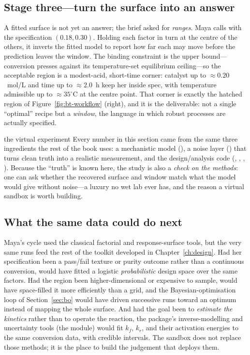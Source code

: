 \subsection{Stage three---turn the surface into an answer}

A fitted surface is not yet an answer; the brief asked for \emph{ranges}. Maya
calls  with the specification
$(0.18,0.30)$. Holding each factor in turn at the centre of the others, it inverts
the fitted model to report how far each may move before the prediction leaves the
window. The binding constraint is the upper bound---conversion presses against its
temperature-set equilibrium ceiling---so the acceptable region is a modest-acid,
short-time corner: catalyst up to $\approx0.20$~mol/L and time up to
$\approx2.0$~h keep her inside spec, with temperature admissible up to
$\approx35^\circ$C at the centre point. That corner is exactly the hatched region
of Figure~\ref{fig:bt-workflow} (right), and it is the deliverable: not a single
``optimal'' recipe but a \emph{window}, the language in which robust processes are
actually specified.

\begin{databox}{the virtual experiment}
Every number in this section came from the same three ingredients the rest of the
book uses: a mechanistic model (), a noise layer
() that turns clean truth into a
realistic measurement, and the design/analysis code
(, , ,
). Because the ``truth'' is known here, the study
is also a \emph{check on the methods}: one can ask whether the recovered surface
and window match what the model would give without noise---a luxury no wet lab
ever has, and the reason a virtual sandbox is worth building.
\end{databox}

\subsection{What the same data could do next}

Maya's cycle used the classical factorial and response-surface tools, but the very
same runs feed the rest of the toolkit developed in Chapter~\ref{ch:design}. Had
her specification been a pass/fail texture or purity outcome rather than a
continuous conversion,  would have fitted a logistic
\emph{probabilistic} design space over the same factors. Had the region been
higher-dimensional or expensive to sample,  would have
space-filled it more efficiently than a grid, and the Bayesian-optimisation loop of
Section~\ref{sec:bo} would have driven successive runs toward an optimum instead of
mapping the whole surface. And had the goal been to \emph{estimate the kinetics}
rather than to operate the reaction, the package's inverse-modelling and
uncertainty tools (the  module) would fit $k_f$, $k_r$, and their
activation energies to the same conversion data, with credible intervals. The
sandbox does not replace those methods; it is the place to build the judgement
that deploys them.

